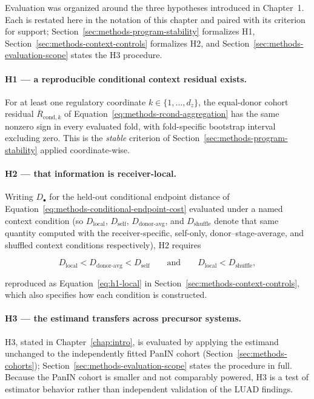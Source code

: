 Evaluation was organized around the three hypotheses introduced in Chapter~1.
Each is restated here in the notation of this chapter and paired with its
criterion for support; Section~\ref{sec:methods-program-stability} formalizes
H1, Section~\ref{sec:methods-context-controls} formalizes H2, and
Section~\ref{sec:methods-evaluation-scope} states the H3 procedure.

\paragraph{H1 --- a reproducible conditional context residual exists.}
For at least one regulatory coordinate $k \in \{1,\ldots,d_z\}$, the equal-donor
cohort residual $\overline{R}_{\mathrm{cond},k}$ of
Equation~\ref{eq:methods-rcond-aggregation} has the same nonzero sign in every
evaluated fold, with fold-specific bootstrap interval excluding zero. This is
the \emph{stable} criterion of Section~\ref{sec:methods-program-stability}
applied coordinate-wise.

\paragraph{H2 --- that information is receiver-local.}
Writing $D_\bullet$ for the held-out conditional endpoint distance of
Equation~\ref{eq:methods-conditional-endpoint-cost} evaluated under a named
context condition (so $D_{\mathrm{local}}$, $D_{\mathrm{self}}$,
$D_{\mathrm{donor\text{-}avg}}$, and $D_{\mathrm{shuffle}}$ denote that same
quantity computed with the receiver-specific, self-only, donor--stage-average,
and shuffled context conditions respectively), H2 requires

\[
D_{\mathrm{local}} < D_{\mathrm{donor\text{-}avg}} < D_{\mathrm{self}}
\qquad\text{and}\qquad
D_{\mathrm{local}} < D_{\mathrm{shuffle}},
\]

reproduced as Equation~\ref{eq:h1-local} in
Section~\ref{sec:methods-context-controls}, which also specifies how each
condition is constructed.

\paragraph{H3 --- the estimand transfers across precursor systems.}
H3, stated in Chapter~\ref{chap:intro}, is evaluated by applying the estimand
unchanged to the independently fitted PanIN cohort
(Section~\ref{sec:methods-cohorts}); Section~\ref{sec:methods-evaluation-scope}
states the procedure in full. Because the PanIN cohort is smaller and not
comparably powered, H3 is a test of estimator behavior rather than independent
validation of the LUAD findings.

